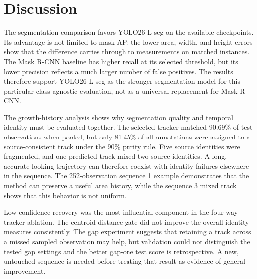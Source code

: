 \documentclass[11pt,a4paper]{article}
\begin{document}
\begin{table}[!htbp]
\centering\small
\caption{Runtime and memory measurements from the fresh Tesla T4 evaluation. Timing boundaries differ by model.}
\label{tab:runtime}
\end{table}

\section{Discussion}

The segmentation comparison favors YOLO26-L-seg on the available checkpoints. Its advantage is not limited to mask AP: the lower area, width, and height errors show that the difference carries through to measurements on matched instances. The Mask R-CNN baseline has higher recall at its selected threshold, but its lower precision reflects a much larger number of false positives. The results therefore support YOLO26-L-seg as the stronger segmentation model for this particular class-agnostic evaluation, not as a universal replacement for Mask R-CNN.

The growth-history analysis shows why segmentation quality and temporal identity must be evaluated together. The selected tracker matched 90.69\% of test observations when pooled, but only 81.45\% of all annotations were assigned to a source-consistent track under the 90\% purity rule. Five source identities were fragmented, and one predicted track mixed two source identities. A long, accurate-looking trajectory can therefore coexist with identity failures elsewhere in the sequence. The 252-observation sequence 1 example demonstrates that the method can preserve a useful area history, while the sequence 3 mixed track shows that this behavior is not uniform.

Low-confidence recovery was the most influential component in the four-way tracker ablation. The centroid-distance gate did not improve the overall identity measures consistently. The gap experiment suggests that retaining a track across a missed sampled observation may help, but validation could not distinguish the tested gap settings and the better gap-one test score is retrospective. A new, untouched sequence is needed before treating that result as evidence of general improvement.
\end{document}
